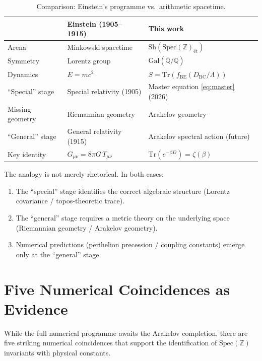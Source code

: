 \documentclass[11pt,a4paper]{article}
\begin{document}
\begin{table}[ht]
\centering
\caption{Comparison: Einstein's programme vs.\ arithmetic spacetime.}
\label{tab:comparison}
\begin{tabular}{@{}lll@{}}
\toprule
& \textbf{Einstein (1905--1915)} & \textbf{This work} \\
\midrule
Arena & Minkowski spacetime & $\mathrm{Sh}(\mathrm{Spec}(\mathbb{Z})_{\text{\'et}})$ \\
Symmetry & Lorentz group & $\mathrm{Gal}(\overline{\mathbb{Q}}/\mathbb{Q})$ \\
Dynamics & $E = mc^2$ & $S = \mathrm{Tr}(f_{\mathrm{BE}}(D_{\mathrm{BC}}/\Lambda))$ \\
``Special'' stage & Special relativity (1905) & Master equation \eqref{eq:master} (2026) \\
Missing geometry & Riemannian geometry & Arakelov geometry \\
``General'' stage & General relativity (1915) & Arakelov spectral action (future) \\
Key identity & $G_{\mu\nu} = 8\pi G\, T_{\mu\nu}$ & $\mathrm{Tr}(e^{-\beta D}) = \zeta(\beta)$ \\
\bottomrule
\end{tabular}
\end{table}

The analogy is not merely rhetorical. In both cases:
\begin{enumerate}
  \item The ``special'' stage identifies the correct algebraic structure
    (Lorentz covariance / topos-theoretic trace).
  \item The ``general'' stage requires a metric theory on the underlying space
    (Riemannian geometry / Arakelov geometry).
  \item Numerical predictions (perihelion precession / coupling constants)
    emerge only at the ``general'' stage.
\end{enumerate}

\section{Five Numerical Coincidences as Evidence}
\label{sec:numerics}

While the full numerical programme awaits the Arakelov completion, there are
five striking numerical coincidences that support the identification of
$\mathrm{Spec}(\mathbb{Z})$ invariants with physical constants.
\end{document}
